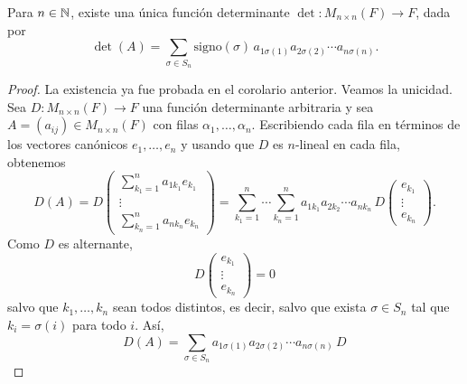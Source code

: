 \documentclass[12pt,a4paper]{book}
\begin{document}
    \begin{teorema}
        Para $n \in \mathbb{N}$, existe una única función determinante $\det: M_{n \times n}(F) \to F$, dada por
        \begin{equation}
            \det(A) = \sum_{\sigma \in S_n} \text{signo}(\sigma) \, a_{1\sigma(1)} a_{2\sigma(2)} \cdots a_{n\sigma(n)}.
            \label{eq:leibniz}
        \end{equation}
    \end{teorema}

    \begin{proof}
        La existencia ya fue probada en el corolario anterior. Veamos la unicidad. Sea $D: M_{n \times n}(F) \to F$ una función determinante arbitraria y sea $A = (a_{ij}) \in M_{n \times n}(F)$ con filas $\alpha_1, \dots, \alpha_n$. Escribiendo cada fila en términos de los vectores canónicos $e_1, \dots, e_n$ y usando que $D$ es $n$-lineal en cada fila, obtenemos
        \begin{equation*}
            D(A) = D
            \begin{pmatrix}
                \sum_{k_1 = 1}^n a_{1k_1} e_{k_1} \\
                \vdots \\
                \sum_{k_n = 1}^n a_{nk_n} e_{k_n}
            \end{pmatrix}
            = \sum_{k_1 = 1}^n \cdots \sum_{k_n = 1}^n a_{1k_1} a_{2k_2} \cdots a_{nk_n} \, D
            \begin{pmatrix}
                e_{k_1} \\
                \vdots \\
                e_{k_n}
            \end{pmatrix}.
        \end{equation*}
        Como $D$ es alternante,
        \begin{equation*}
            D
            \begin{pmatrix}
                e_{k_1} \\
                \vdots \\
                e_{k_n}
            \end{pmatrix}
            = 0
        \end{equation*}
        salvo que $k_1, \dots, k_n$ sean todos distintos, es decir, salvo que exista $\sigma \in S_n$ tal que $k_i = \sigma(i)$ para todo $i$. Así,
        \begin{equation*}
            D(A) = \sum_{\sigma \in S_n} a_{1\sigma(1)} a_{2\sigma(2)} \cdots a_{n\sigma(n)} \, D

\end{equation*}
\end{proof}
\end{document}
